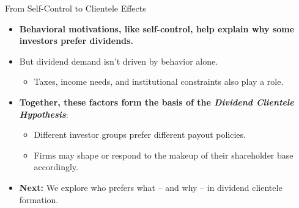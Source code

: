 \begin{frame}{From Self-Control to Clientele Effects}
\footnotesize
\begin{itemize}
    \item \textbf{Behavioral motivations, like self-control, help explain why some investors prefer dividends.}
    
    \item But dividend demand isn't driven by behavior alone.
    \begin{itemize}
        \item Taxes, income needs, and institutional constraints also play a role.
    \end{itemize}
    
    \vspace{0.2cm}
    \item \textbf{Together, these factors form the basis of the \textit{Dividend Clientele Hypothesis}}:
    \begin{itemize}
        \item Different investor groups prefer different payout policies.
        \item Firms may shape or respond to the makeup of their shareholder base accordingly.
    \end{itemize}
    
    \vspace{0.2cm}
    \item \textbf{Next:} We explore who prefers what -- and why -- in dividend clientele formation.
\end{itemize}
\end{frame}

